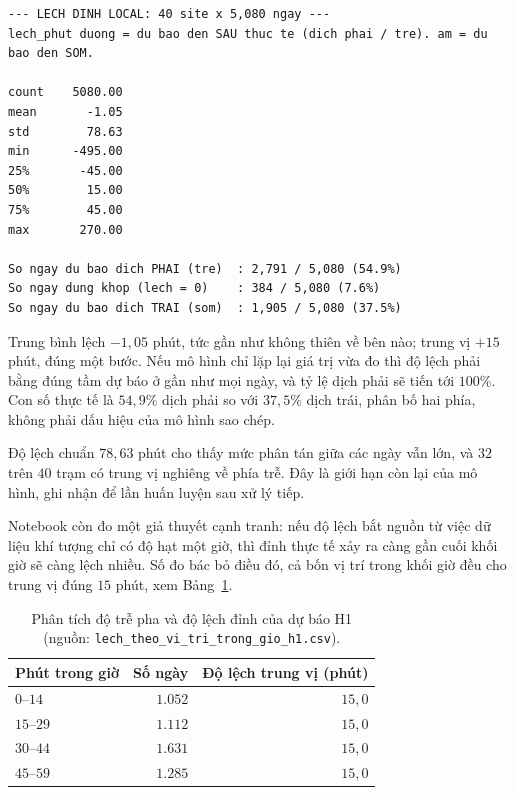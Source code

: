 \begingroup
\par{}\vspace{8pt}
\scriptsize\renewcommand{\baselinestretch}{1.0}\selectfont
\begin{verbatim}
--- LECH DINH LOCAL: 40 site x 5,080 ngay ---
lech_phut duong = du bao den SAU thuc te (dich phai / tre). am = du bao den SOM.

count    5080.00
mean       -1.05
std        78.63
min      -495.00
25%       -45.00
50%        15.00
75%        45.00
max       270.00

So ngay du bao dich PHAI (tre)  : 2,791 / 5,080 (54.9%)
So ngay dung khop (lech = 0)    : 384 / 5,080 (7.6%)
So ngay du bao dich TRAI (som)  : 1,905 / 5,080 (37.5%)
\end{verbatim}
\par\vspace{8pt}
\endgroup
Trung bình lệch $-1{,}05$ phút, tức gần như không thiên về bên nào; trung vị $+15$ phút, đúng
một bước. Nếu mô hình chỉ lặp lại giá trị vừa đo thì độ lệch phải bằng đúng tầm dự báo ở gần
như mọi ngày, và tỷ lệ dịch phải sẽ tiến tới $100\%$. Con số thực tế là $54{,}9\%$ dịch phải so
với $37{,}5\%$ dịch trái, phân bố hai phía, không phải dấu hiệu của mô hình sao chép.

Độ lệch chuẩn $78{,}63$ phút cho thấy mức phân tán giữa các ngày vẫn lớn, và $32$ trên $40$
trạm có trung vị nghiêng về phía trễ. Đây là giới hạn còn lại của mô hình, ghi nhận để lần huấn
luyện sau xử lý tiếp.

Notebook còn đo một giả thuyết cạnh tranh: nếu độ lệch bắt nguồn từ việc dữ liệu khí tượng chỉ
có độ hạt một giờ, thì đỉnh thực tế xảy ra càng gần cuối khối giờ sẽ càng lệch nhiều.
Số đo bác bỏ điều đó, cả bốn vị trí trong khối giờ đều cho trung vị đúng $15$ phút, xem Bảng~\ref{tab:lech_theo_vi_tri}.

\begin{table}[htbp]
\centering
\caption{Phân tích độ trễ pha và độ lệch đỉnh của dự báo H1 (nguồn: \texttt{lech\_theo\_vi\_tri\_trong\_gio\_h1.csv}).}
\label{tab:lech_theo_vi_tri}
\small
\begin{tabular}{l r r}
\toprule
\textbf{Phút trong giờ} & \textbf{Số ngày} & \textbf{Độ lệch trung vị (phút)} \\
\midrule
$0$--$14$  & $1.052$ & $15{,}0$ \\
$15$--$29$ & $1.112$ & $15{,}0$ \\
$30$--$44$ & $1.631$ & $15{,}0$ \\
$45$--$59$ & $1.285$ & $15{,}0$ \\
\bottomrule
\end{tabular}
\end{table}


